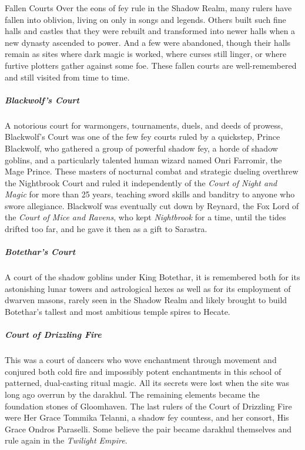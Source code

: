 \documentclass[10pt,a4paper,twoside,bg=print,twocolumn,openany,nodeprecatedcode]{dndbook}
\begin{document}
\begin{DndSidebar}[float=!b]{Fallen Courts}
Over the eons of fey rule in the Shadow Realm, many rulers have fallen into oblivion, living on only in songs and legends. Others built such fine halls and castles that they were rebuilt and transformed into newer halls when a new dynasty ascended to power. And a few were abandoned, though their halls remain as sites where dark magic is worked, where curses still linger, or where furtive plotters gather against some foe. These fallen courts are well-remembered and still visited from time to time.



\subparagraph{Blackwolf's Court}
A notorious court for warmongers, tournaments, duels, and deeds of prowess, Blackwolf's Court was one of the few fey courts ruled by a quickstep, Prince Blackwolf, who gathered a group of powerful shadow fey, a horde of shadow goblins, and a particularly talented human wizard named Onri Farromir, the Mage Prince. These masters of nocturnal combat and strategic dueling overthrew the Nightbrook Court and ruled it independently of the \textit{Court of Night and Magic} for more than 25 years, teaching sword skills and banditry to anyone who swore allegiance. Blackwolf was eventually cut down by Reynard, the Fox Lord of the \textit{Court of Mice and Ravens}, who kept \textit{Nightbrook} for a time, until the tides drifted too far, and he gave it then as a gift to Sarastra.



\subparagraph{Botethar's Court}
A court of the shadow goblins under King Botethar, it is remembered both for its astonishing lunar towers and astrological hexes as well as for its employment of dwarven masons, rarely seen in the Shadow Realm and likely brought to build Botethar's tallest and most ambitious temple spires to Hecate.



\subparagraph{Court of Drizzling Fire}
This was a court of dancers who wove enchantment through movement and conjured both cold fire and impossibly potent enchantments in this school of patterned, dual-casting ritual magic. All its secrets were lost when the site was long ago overrun by the darakhul. The remaining elements became the foundation stones of Gloomhaven. The last rulers of the Court of Drizzling Fire were Her Grace Tommika Telanni, a shadow fey countess, and her consort, His Grace Ondros Paraselli. Some believe the pair became darakhul themselves and rule again in the \textit{Twilight Empire}.




\end{DndSidebar}
\end{document}
